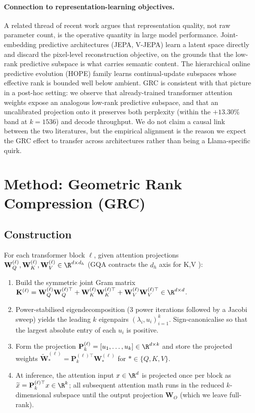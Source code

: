\documentclass[11pt]{article}
\providecommand{\Kmat}{\mathbf{K}}
\providecommand{\Pmat}{\mathbf{P}}
\providecommand{\Wmat}{\mathbf{W}}
\begin{document}
\paragraph{Connection to representation-learning objectives.}
A related thread of recent work argues that representation quality, not
raw parameter count, is the operative quantity in large model performance.
Joint-embedding predictive architectures (JEPA, V-JEPA)
\cite{assran2023ijepa,bardes2024vjepa} learn a latent space directly and
discard the pixel-level reconstruction objective, on the grounds that the
low-rank predictive subspace is what carries semantic content. The
hierarchical online predictive evolution (HOPE) family
\cite{behrouz2025hope} learns continual-update subspaces whose effective
rank is bounded well below ambient. GRC is consistent with that picture in
a post-hoc setting: we observe that already-trained transformer attention
weights expose an analogous low-rank predictive subspace, and that an
uncalibrated projection onto it preserves both perplexity (within the
$+13.30\%$ band at $k{=}1536$) and decode throughput. We do not claim a
causal link between the two literatures, but the empirical alignment is the
reason we expect the GRC effect to transfer across architectures rather
than being a Llama-specific quirk.

\section{Method: Geometric Rank Compression (GRC)}
\label{sec:method}

\subsection{Construction}
For each transformer block $\ell$, given attention projections
$\Wmat_Q^{(\ell)},\Wmat_K^{(\ell)},\Wmat_V^{(\ell)}\in\R^{d\times d_h}$
(GQA contracts the $d_h$ axis for K,V \cite{ainslie2023gqa}):
\begin{enumerate}
\item Build the symmetric joint Gram matrix
$\Kmat^{(\ell)} = \Wmat_Q^{(\ell)}\Wmat_Q^{(\ell)\top}+\Wmat_K^{(\ell)}\Wmat_K^{(\ell)\top}+\Wmat_V^{(\ell)}\Wmat_V^{(\ell)\top}\in\R^{d\times d}$.
\item Power-stabilised eigendecomposition (3 power iterations followed by a
Jacobi sweep) yields the leading $k$ eigenpairs
$(\lambda_i,u_i)_{i=1}^k$.  Sign-canonicalise so that the largest
absolute entry of each $u_i$ is positive.
\item Form the projection $\Pmat_k^{(\ell)}=[u_1,\dots,u_k]
\in\R^{d\times k}$ and store the projected weights
$\widetilde{\Wmat}_*^{(\ell)} = \Pmat_k^{(\ell)\top}\Wmat_*^{(\ell)}$ for
$*\in\{Q,K,V\}$.
\item At inference, the attention input $x\in\R^d$ is projected once
per block as $\widetilde{x} = \Pmat_k^{(\ell)\top}x\in\R^k$;
all subsequent attention math runs in the reduced $k$-dimensional subspace
until the output projection $\Wmat_O$ (which we leave full-rank).
\end{enumerate}
\end{document}
